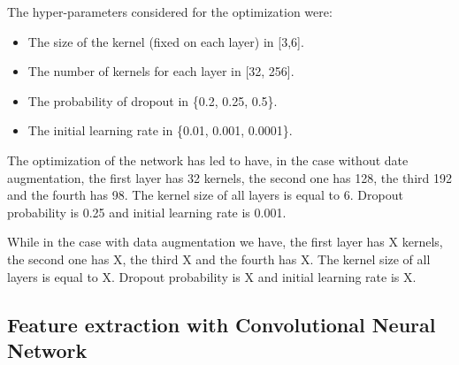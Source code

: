The hyper-parameters considered for the optimization were: 
\begin{itemize}
    \item The size of the kernel (fixed on each layer) in [3,6].
    \item The number of kernels for each layer in [32, 256].
    \item The probability of dropout in \{0.2, 0.25, 0.5\}.
    \item The initial learning rate in \{0.01, 0.001, 0.0001\}.
\end{itemize}

The optimization of the network has led to have, in the case without date augmentation, the first layer has 32 kernels, the second one has 128, the third 192 and the fourth has 98. The kernel size of all layers is equal to 6. Dropout probability is 0.25 and initial learning rate is 0.001.

While in the case with data augmentation we have, the first layer has X kernels, the second one has X, the third X and the fourth has X. The kernel size of all layers is equal to X. Dropout probability is X and initial learning rate is X.

\subsection{Feature extraction with Convolutional Neural Network}


